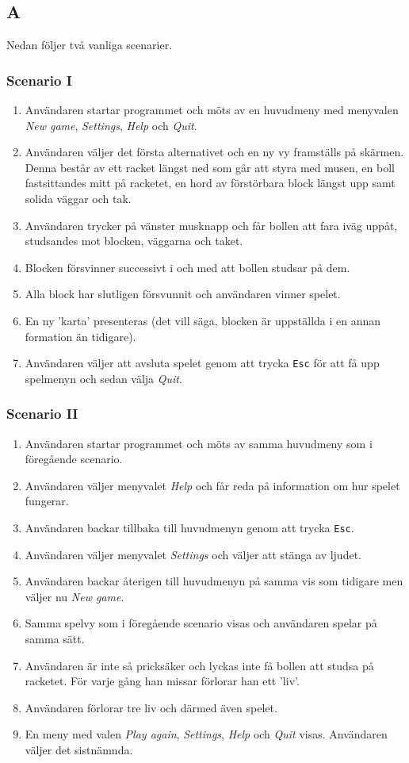 \documentclass[11pt,a4paper]{article}
\begin{document}
\subsection{A}
Nedan följer två vanliga scenarier.

\subsubsection{Scenario I}
\begin{enumerate}
	\item Användaren startar programmet och möts av en huvudmeny med menyvalen \emph{New game}, \emph{Settings}, \emph{Help} och \emph{Quit}.
	\item Användaren väljer det första alternativet och en ny vy framställs på skärmen. Denna består av ett racket längst ned som går att styra med musen, en boll fastsittandes mitt på racketet, en hord av förstörbara block längst upp samt solida väggar och tak.
	\item Användaren trycker på vänster musknapp och får bollen att fara iväg uppåt, studsandes mot blocken, väggarna och taket.
	\item Blocken försvinner successivt i och med att bollen studsar på dem.
	\item Alla block har slutligen försvunnit och användaren vinner spelet.
	\item En ny 'karta' presenteras (det vill säga, blocken är uppställda i en annan formation än tidigare).
	\item Användaren väljer att avsluta spelet genom att trycka \texttt{Esc} för att få upp spelmenyn och sedan välja \emph{Quit}.
\end{enumerate}

\subsubsection{Scenario II}
\begin{enumerate}
	\item Användaren startar programmet och möts av samma huvudmeny som i föregående scenario.
	\item Användaren väljer menyvalet \emph{Help} och får reda på information om hur spelet fungerar.
	\item Användaren backar tillbaka till huvudmenyn genom att trycka \texttt{Esc}.
	\item Användaren väljer menyvalet \emph{Settings} och väljer att stänga av ljudet.
	\item Användaren backar återigen till huvudmenyn på samma vis som tidigare men väljer nu \emph{New game}.
	\item Samma spelvy som i föregående scenario visas och användaren spelar på samma sätt.
	\item Användaren är inte så pricksäker och lyckas inte få bollen att studsa på racketet. För varje gång han missar förlorar han ett 'liv'.
	\item Användaren förlorar tre liv och därmed även spelet.
	\item En meny med valen \emph{Play again}, \emph{Settings}, \emph{Help} och \emph{Quit} visas. Användaren väljer det sistnämnda.
\end{enumerate}
\end{document}
